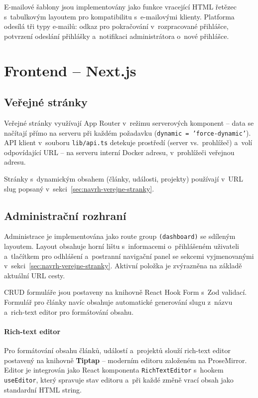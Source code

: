 E-mailové šablony jsou implementovány jako funkce vracející HTML řetězec s~tabulkovým layoutem pro kompatibilitu s~e-mailovými klienty. Platforma odesílá tři typy e-mailů: odkaz pro pokračování v~rozpracované přihlášce, potvrzení odeslání přihlášky a~notifikaci administrátora o~nové přihlášce.

\section{Frontend -- Next.js}

\subsection{Veřejné stránky}

Veřejné stránky využívají App Router v~režimu serverových komponent -- data se načítají přímo na serveru při každém požadavku (\texttt{dynamic = 'force-dynamic'}). API klient v~souboru \texttt{lib/api.ts} detekuje prostředí (server vs.~prohlížeč) a~volí odpovídající URL -- na serveru interní Docker adresu, v~prohlížeči veřejnou adresu.

Stránky s~dynamickým obsahem (články, události, projekty) používají v~URL slug popsaný v~sekci~\ref{sec:navrh-verejne-stranky}.

\subsection{Administrační rozhraní}

Administrace je implementována jako route group \texttt{(dashboard)} se sdíleným layoutem. Layout obsahuje horní lištu s~informacemi o~přihlášeném uživateli a~tlačítkem pro odhlášení a~postranní navigační panel se sekcemi vyjmenovanými v~sekci~\ref{sec:navrh-verejne-stranky}. Aktivní položka je zvýrazněna na základě aktuální URL cesty.

CRUD formuláře jsou postaveny na knihovně React Hook Form s~Zod validací. Formulář pro články navíc obsahuje automatické generování slugu z~názvu a~rich-text editor pro formátování obsahu.

\paragraph{Rich-text editor}
\label{sec:impl-richtext}

Pro formátování obsahu článků, událostí a~projektů slouží rich-text editor postavený na knihovně \textbf{Tiptap} -- moderním editoru založeném na ProseMirror. Editor je integrován jako React komponenta \texttt{RichTextEditor} s~hookem \texttt{useEditor}, který spravuje stav editoru a~při každé změně vrací obsah jako standardní HTML string.


